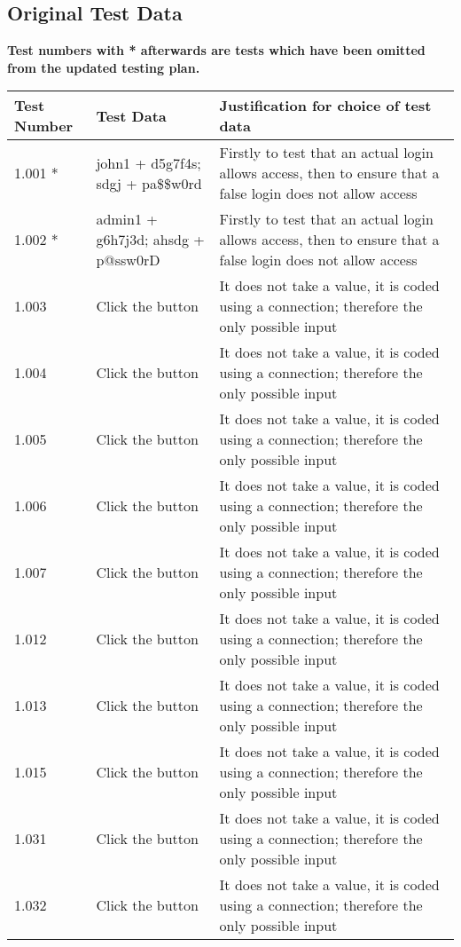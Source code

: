\begin{landscape}
\subsection{Original Test Data}

\textbf{Test numbers with * afterwards are tests which have been omitted from the updated testing plan.}

\begin{center}
\begin{longtable}{|p{4cm}|p{4cm}|p{5cm}|} \hline
\textbf{Test Number} & \textbf{Test Data} & \textbf{Justification for choice of test data} \\ \hline
1.001 * & john1 + d5g7f4s; sdgj + pa\$\$w0rd & Firstly to test that an actual login allows access, then to ensure that a false login does not allow access \\ \hline
1.002 * & admin1 + g6h7j3d; ahsdg + p@ssw0rD & Firstly to test that an actual login allows access, then to ensure that a false login does not allow access \\ \hline
1.003 & Click the button & It does not take a value, it is coded using a connection; therefore the only possible input \\ \hline
1.004 & Click the button & It does not take a value, it is coded using a connection; therefore the only possible input \\ \hline
1.005 & Click the button & It does not take a value, it is coded using a connection; therefore the only possible input \\ \hline
1.006 & Click the button & It does not take a value, it is coded using a connection; therefore the only possible input \\ \hline
1.007 & Click the button & It does not take a value, it is coded using a connection; therefore the only possible input \\ \hline
1.012 & Click the button & It does not take a value, it is coded using a connection; therefore the only possible input \\ \hline
1.013 & Click the button & It does not take a value, it is coded using a connection; therefore the only possible input \\ \hline
1.015 & Click the button & It does not take a value, it is coded using a connection; therefore the only possible input \\ \hline
1.031 & Click the button & It does not take a value, it is coded using a connection; therefore the only possible input \\ \hline
1.032 & Click the button & It does not take a value, it is coded using a connection; therefore the only possible input \\ \hline

\end{longtable}
\end{center}
\end{landscape}
